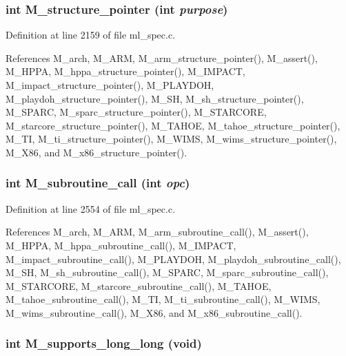 \subsubsection{\setlength{\rightskip}{0pt plus 5cm}int M\_\-structure\_\-pointer (int {\em purpose})}\label{m__spec_8h_371700f749675ca31c8fa1ddab762d1f}




Definition at line 2159 of file ml\_\-spec.c.

References M\_\-arch, M\_\-ARM, M\_\-arm\_\-structure\_\-pointer(), M\_\-assert(), M\_\-HPPA, M\_\-hppa\_\-structure\_\-pointer(), M\_\-IMPACT, M\_\-impact\_\-structure\_\-pointer(), M\_\-PLAYDOH, M\_\-playdoh\_\-structure\_\-pointer(), M\_\-SH, M\_\-sh\_\-structure\_\-pointer(), M\_\-SPARC, M\_\-sparc\_\-structure\_\-pointer(), M\_\-STARCORE, M\_\-starcore\_\-structure\_\-pointer(), M\_\-TAHOE, M\_\-tahoe\_\-structure\_\-pointer(), M\_\-TI, M\_\-ti\_\-structure\_\-pointer(), M\_\-WIMS, M\_\-wims\_\-structure\_\-pointer(), M\_\-X86, and M\_\-x86\_\-structure\_\-pointer().
\subsubsection{\setlength{\rightskip}{0pt plus 5cm}int M\_\-subroutine\_\-call (int {\em opc})}\label{m__spec_8h_a3d8bf96ab72ce380059a052a721c6ca}




Definition at line 2554 of file ml\_\-spec.c.

References M\_\-arch, M\_\-ARM, M\_\-arm\_\-subroutine\_\-call(), M\_\-assert(), M\_\-HPPA, M\_\-hppa\_\-subroutine\_\-call(), M\_\-IMPACT, M\_\-impact\_\-subroutine\_\-call(), M\_\-PLAYDOH, M\_\-playdoh\_\-subroutine\_\-call(), M\_\-SH, M\_\-sh\_\-subroutine\_\-call(), M\_\-SPARC, M\_\-sparc\_\-subroutine\_\-call(), M\_\-STARCORE, M\_\-starcore\_\-subroutine\_\-call(), M\_\-TAHOE, M\_\-tahoe\_\-subroutine\_\-call(), M\_\-TI, M\_\-ti\_\-subroutine\_\-call(), M\_\-WIMS, M\_\-wims\_\-subroutine\_\-call(), M\_\-X86, and M\_\-x86\_\-subroutine\_\-call().
\subsubsection{\setlength{\rightskip}{0pt plus 5cm}int M\_\-supports\_\-long\_\-long (void)}\label{m__spec_8h_e676ec5da379bec93660cec420e81ccb}




